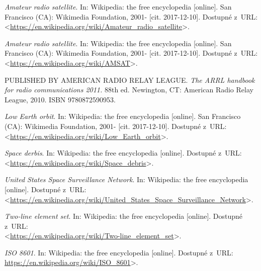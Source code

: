 

\begin{literatura}{99}

    \emph{Amateur radio satellite}. In: Wikipedia: the free encyclopedia\/ [online].
    San Francisco (CA): Wikimedia Foundation, 2001- [cit. 2017-12-10].
    Dostupné z~URL:\\
    <\url{https://en.wikipedia.org/wiki/Amateur_radio_satellite}>.

    \emph{Amateur radio satellite}. In: Wikipedia: the free encyclopedia\/ [online].
    San Francisco (CA): Wikimedia Foundation, 2001- [cit. 2017-12-10].
    Dostupné z~URL:\\
    <\url{https://en.wikipedia.org/wiki/AMSAT}>.

    PUBLISHED BY AMERICAN RADIO RELAY LEAGUE.
    \emph{The ARRL handbook for radio communications 2011.} 88th ed. Newington, CT: American Radio Relay League, 2010. ISBN 9780872590953.

    \emph{Low Earth orbit}. In: Wikipedia: the free encyclopedia\/ [online].
    San Francisco (CA): Wikimedia Foundation, 2001- [cit. 2017-12-10].
    Dostupné z~URL:\\
    <\url{https://en.wikipedia.org/wiki/Low_Earth_orbit}>.

    \emph{Space derbis}. In: Wikipedia: the free encyclopedia\/ [online].
    Dostupné z~URL:\\
    <\url{https://en.wikipedia.org/wiki/Space_debris}>.

    \emph{United States Space Surveillance Network}. In: Wikipedia: the free encyclopedia\/ [online].
    Dostupné z~URL:\\
    <\url{https://en.wikipedia.org/wiki/United_States_Space_Surveillance_Network}>.

    \emph{Two-line element set}. In: Wikipedia: the free encyclopedia\/ [online].
    Dostupné z~URL:\\
    <\url{https://en.wikipedia.org/wiki/Two-line_element_set}>.

    \emph{ISO 8601}. In: Wikipedia: the free encyclopedia\/ [online].
    Dostupné z~URL:\\
    \url{https://en.wikipedia.org/wiki/ISO_8601}>.


\end{literatura}
